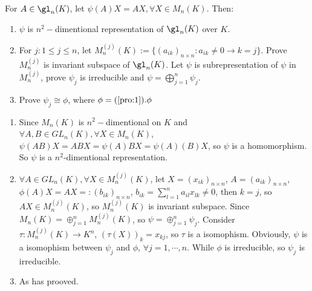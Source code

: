 \documentclass{ctexart}
\begin{document}
\begin{problem}
    For $A\in\gl_n(K)$, let $\psi(A)X=AX,\forall X\in M_n(K)$. Then:
    \begin{enumerate}
        \item $\psi$ is $n^2-$dimentional representation of $\gl_n(K)$ over $K$. 
        \item For $j:1\leq j\leq n$, let $M_n^{(j)}(K):=\{(a_{ik})_{n\times n}:a_{ik}\neq 0\to k=j\}$. Prove $M_n^{(j)}$ is invariant subspace of $\gl_n(K)$. Let $\psi$ is subrepresentation of $\psi$ in $M_n^{(j)}$, prove $\psi_j$ is irreducible and $\psi=\bigoplus_{j=1}^n \psi_j$. 
        \item Prove $\psi_j\cong \phi$, where $\phi=(\Cref{pro:1}).\phi$
    \end{enumerate}
\end{problem}
\begin{solution}
    \begin{enumerate}
        \item Since $M_n(K)$ is $n^2-$dimentional on $K$ and $\forall A,B\in GL_n(K),\forall X\in M_n(K)$, $\psi(AB)X=ABX=\psi(A)BX=\psi(A)(B)X$, so $\psi$ is a homomorphism. So $\psi$ is a $n^2$-dimentional representation.
        \item\label{it:1} $\forall A\in GL_n(K),\forall X\in M_n^{(j)}(K)$, let $X=(x_{ik})_{n\times n}$, $A=(a_{ik})_{n\times n}$, $\phi(A)X=AX
        =:(b_{ik})_{n\times n}$, $b_{ik}=\sum_{l=1}^na_{il}x_{lk}\neq 0$, then $k=j$, so $AX\in M_n^{(j)}(K)$, so $M_n^{(j)}(K)$ is invariant subspace. Since $M_n{(K)}=\oplus_{j=1}^nM_n^{(j)}(K)$, so $\psi=\oplus_{j=1}^n\psi_j$. Consider $\tau : M_n^{(j)}(K)\to K^n$, $(\tau(X))_{k}=x_{kj}$, so $\tau$ is a isomophism. Obviously, $\psi$ is a isomophism between $\psi_j$ and $\phi$, $\forall j=1,\cdots,n$. While $\phi$ is irreducible, so $\psi_j$ is irreducible.
        \item As  has prooved.
        
    \end{enumerate}
\end{solution}
\end{document}
